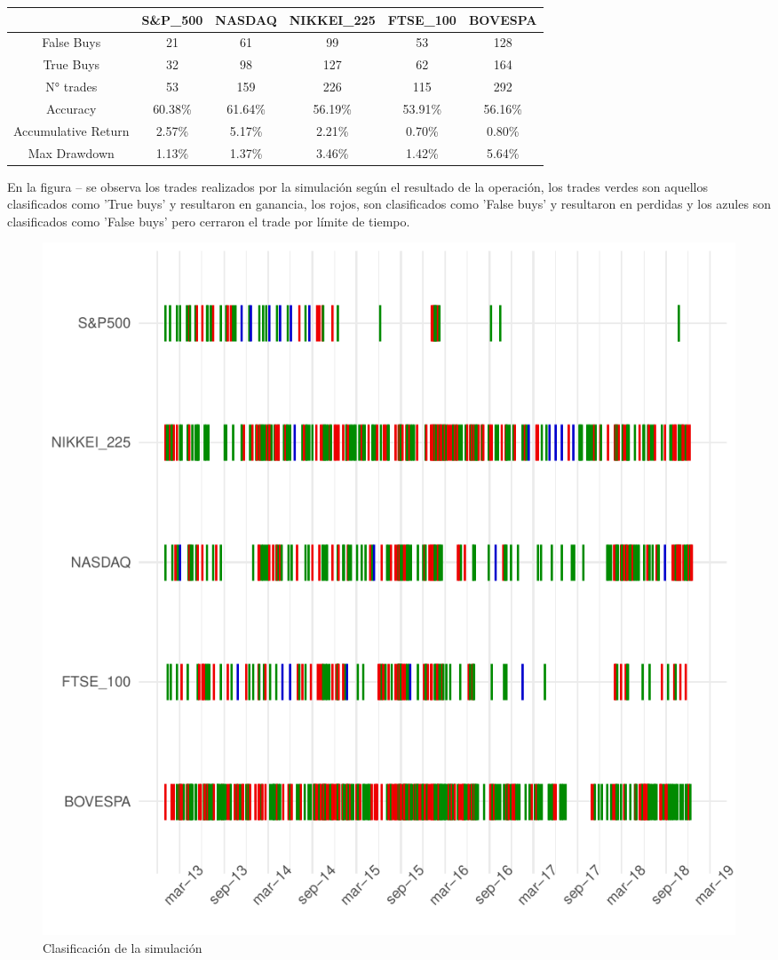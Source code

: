 \documentclass[a4paper,12pt]{Latex/Classes/PhDthesisPSnPDF}
\begin{document}
\begin{center}
\begin{table}[ht]
\centering
\begin{tabular}{cccccc}
  \hline
 & S\&P\_500 & NASDAQ & NIKKEI\_225 & FTSE\_100 & BOVESPA \\ 
  \hline
False Buys & 21 & 61 & 99 & 53 & 128 \\ 
  True Buys & 32 & 98 & 127 & 62 & 164 \\ 
  N° trades & 53 & 159 & 226 & 115 & 292 \\ 
  Accuracy & 60.38\% & 61.64\% & 56.19\% & 53.91\% & 56.16\% \\ 
  Accumulative Return & 2.57\% & 5.17\% & 2.21\% & 0.70\% & 0.80\% \\ 
  Max Drawdown & 1.13\% & 1.37\% & 3.46\% & 1.42\% & 5.64\% \\ 
   \hline
\end{tabular}
\end{table}\end{center}
 

En la figura -- se observa los trades realizados por la simulación según el resultado de la operación, los trades verdes son aquellos clasificados como 'True buys' y resultaron en ganancia, los rojos, son clasificados como 'False buys' y resultaron en perdidas y los azules son clasificados como 'False buys' pero cerraron el trade por límite de tiempo.

\begin{figure}[H]
\centering
\includegraphics{main-022}
\caption{Clasificación de la simulación}
\end{figure}
\end{document}
